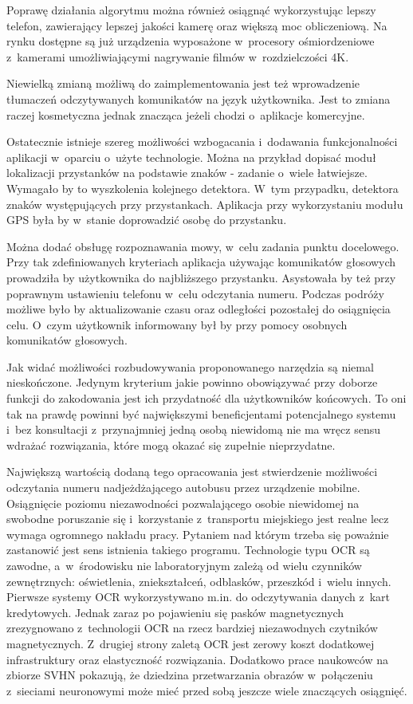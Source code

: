 Poprawę działania algorytmu można również osiągnąć wykorzystując 
lepszy telefon, zawierający lepszej jakości kamerę oraz
większą moc obliczeniową. Na rynku dostępne są już urządzenia
wyposażone w~procesory ośmiordzeniowe z~kamerami umożliwiającymi 
nagrywanie filmów w~rozdzielczości 4K.

Niewielką zmianą możliwą do zaimplementowania jest też wprowadzenie
tłumaczeń odczytywanych komunikatów na język użytkownika. 
Jest to zmiana raczej kosmetyczna jednak znacząca jeżeli chodzi
o~aplikacje komercyjne.

Ostatecznie istnieje szereg możliwości wzbogacania i~dodawania
funkcjonalności aplikacji w~oparciu o~użyte technologie.
Można na przykład dopisać moduł lokalizacji przystanków
na podstawie znaków - zadanie o~wiele łatwiejsze. Wymagało by to
wyszkolenia kolejnego detektora. W~tym przypadku, detektora znaków
występujących przy przystankach. Aplikacja przy wykorzystaniu 
modułu GPS była by w~stanie doprowadzić osobę do przystanku.

Można dodać obsługę rozpoznawania mowy, w~celu zadania punktu docelowego.
Przy tak zdefiniowanych kryteriach aplikacja używając komunikatów
głosowych prowadziła by użytkownika do najbliższego przystanku. 
Asystowała by też przy poprawnym ustawieniu telefonu w~celu odczytania
numeru. Podczas podróży możliwe było by aktualizowanie czasu oraz
odległości pozostałej do osiągnięcia celu. O~czym użytkownik informowany
był by przy pomocy osobnych komunikatów głosowych.

Jak widać możliwości rozbudowywania proponowanego narzędzia są niemal
nieskończone. Jedynym kryterium jakie powinno obowiązywać przy
doborze funkcji do zakodowania jest ich przydatność dla użytkowników 
końcowych. To oni tak na prawdę powinni być największymi beneficjentami 
potencjalnego systemu i~bez konsultacji z~przynajmniej jedną osobą
niewidomą nie ma wręcz sensu wdrażać rozwiązania, które mogą 
okazać się zupełnie nieprzydatne.

Największą
wartością dodaną tego opracowania jest stwierdzenie możliwości odczytania
numeru nadjeżdżającego autobusu przez urządzenie mobilne.
Osiągnięcie poziomu niezawodności pozwalającego osobie niewidomej 
na swobodne poruszanie się i~korzystanie z~transportu miejskiego jest
realne lecz wymaga ogromnego nakładu pracy. Pytaniem nad którym 
trzeba się poważnie zastanowić jest sens istnienia takiego programu.
Technologie typu OCR są zawodne, a~w~środowisku nie laboratoryjnym
zależą od wielu czynników zewnętrznych: oświetlenia, zniekształceń,
odblasków, przeszkód i~wielu innych. Pierwsze systemy 
OCR wykorzystywano m.in. do odczytywania danych z~kart kredytowych.
Jednak zaraz po pojawieniu się pasków magnetycznych zrezygnowano
z~technologii OCR na rzecz bardziej niezawodnych 
czytników magnetycznych. Z~drugiej strony zaletą OCR jest zerowy
koszt dodatkowej infrastruktury oraz elastyczność rozwiązania.
Dodatkowo prace naukowców na zbiorze SVHN pokazują, że 
dziedzina przetwarzania obrazów w~połączeniu z~sieciami neuronowymi
może mieć przed sobą jeszcze wiele znaczących osiągnięć.
